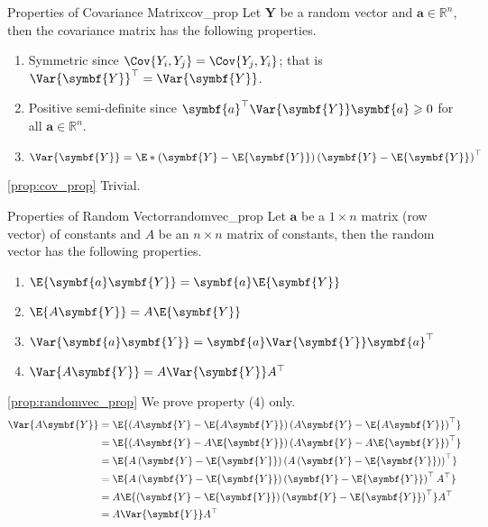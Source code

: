\begin{Proposition}{Properties of Covariance Matrix}{cov_prop}
    Let $ \symbf{Y} $ be a random vector and $ \symbf{a}\in\mathbb{R}^n $,
    then the covariance matrix has the following properties.
    \begin{enumerate}[label=(\arabic*)]
        \item Symmetric since $ \Cov{Y_i,Y_j}=\Cov{Y_j,Y_i} $; that is $ \Var{\symbf{Y}}^\top=\Var{\symbf{Y}} $.
        \item Positive semi-definite since
              $ \symbf{a}^\top\Var{\symbf{Y}}\symbf{a}\geqslant 0 $
              for all $ \symbf{a}\in\mathbb{R}^n $.
        \item $ \Var{\symbf{Y}}=
                  \E*{\left( \symbf{Y}-\E{\symbf{Y}} \right)\left( \symbf{Y}-\E{\symbf{Y}} \right)^\top} $
    \end{enumerate}
\end{Proposition}
\begin{Proof}{\ref{prop:cov_prop}}{}
    Trivial.
\end{Proof}
\begin{Proposition}{Properties of Random Vector}{randomvec_prop}
    Let $ \symbf{a} $ be a $ 1\times n $ matrix (row vector)
    of constants and $ A $ be an $ n\times n $ matrix of constants, then
    the random vector has the following properties.
    \begin{enumerate}[label=(\arabic*)]
        \item $ \E{\symbf{a}\symbf{Y}}=\symbf{a}\E{\symbf{Y}} $
        \item $ \E{A\symbf{Y}}=A\E{\symbf{Y}} $
        \item $ \Var{\symbf{a}\symbf{Y}}=\symbf{a}\Var{\symbf{Y}}\symbf{a}^\top $
        \item $ \Var{A\symbf{Y}}=A\Var{\symbf{Y}}A^\top $
    \end{enumerate}
\end{Proposition}
\begin{Proof}{\ref{prop:randomvec_prop}}{}
    We prove property (4) only.
    \begin{align*}
        \Var{A\symbf{Y}}
         & =\E{\left(A\symbf{Y}-\E{A\symbf{Y}}\right)
        \left(A\symbf{Y}-\E{A\symbf{Y}}\right)^\top}                                                     \\
         & =\E{\left( A\symbf{Y}-A\E{\symbf{Y}} \right)
        \left( A\symbf{Y}-A\E{\symbf{Y}} \right)^\top}                                                   \\
         & =\E{A\left( \symbf{Y}-\E{\symbf{Y}} \right)
        \left( A\left( \symbf{Y}-\E{\symbf{Y}} \right) \right)^\top}                                     \\
         & =\E{A\left( \symbf{Y}-\E{\symbf{Y}} \right)
        \left( \symbf{Y}-\E{\symbf{Y}} \right)^\top A^\top}                                              \\
         & =A\E{\left( \symbf{Y}-\E{\symbf{Y}} \right)\left( \symbf{Y}-\E{\symbf{Y}} \right)^\top}A^\top \\
         & =A\Var{\symbf{Y}}A^\top
    \end{align*}
\end{Proof}
